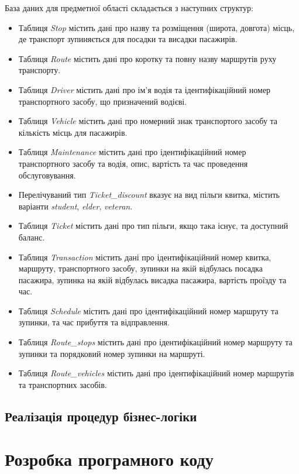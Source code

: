 \documentclass[oneside,14pt]{extarticle}
\begin{document}
База даних для предметної області складається з наступних структур:
\begin{itemize}
\item Таблиця \textit{Stop} містить дані про назву та розміщення (широта, довгота) місць, де транспорт зупиняється для посадки та висадки пасажирів.
\item Таблиця \textit{Route} містить дані про коротку та повну назву маршрутів руху транспорту.
\item Таблиця \textit{Driver} містить дані про ім'я водія та ідентифікаційний номер транспортного засобу, що призначений водієві.
\item Таблиця \textit{Vehicle} містить дані про номерний знак транспортого засобу та кількість місць для пасажирів.
\item Таблиця \textit{Maintenance} містить дані про ідентифікаційний номер транспортного засобу та водія, опис, вартість та час проведення обслуговування.
\item Перелічуваний тип \textit{Ticket\_discount} вказує на вид пільги квитка, містить варіанти \textit{student}, \textit{elder}, \textit{veteran}.
\item Таблиця \textit{Ticket} містить дані про тип пільги, якщо така існує, та доступний баланс.
\item Таблиця \textit{Transaction} містить дані про ідентифікаційний номер квитка, маршруту, транспортного засобу, зупинки на якій відбулась посадка пасажира, зупинка на якій відбулась висадка пасажира, вартість проїзду  та час.
\item Таблиця \textit{Schedule} містить дані про ідентифікаційний номер маршруту та зупинки, та час прибуття та відправлення.
\item Таблиця \textit{Route\_stops} містить дані про ідентифікаційний номер маршруту та зупинки та порядковий номер зупинки на маршруті.
\item Таблиця \textit{Route\_vehicles} містить дані про ідентифікаційний номер маршрутів та транспортних засобів.
\end{itemize}

\subsection{Реалізація процедур бізнес-логіки}


\newpage

\section{Розробка програмного коду}
\end{document}
